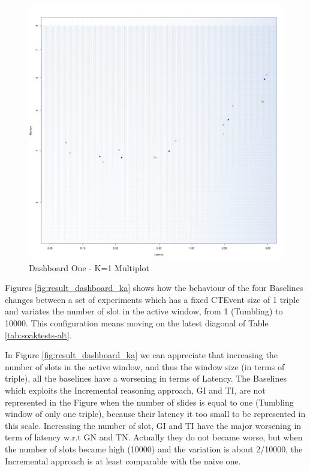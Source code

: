 \begin{figure}[htb]
	\centering
	\includegraphics[width=0.90\linewidth]{images/dashboard-1}	
	\caption{Dashboard One - K=1 Multiplot} 
	\label{fig:result_dashboard_kb}
\end{figure}

Figures \ref{fig:result_dashboard_ka} shows how the behaviour of the four Baselines changes between a set of experiments which has a fixed CTEvent size of 1 triple and variates the number of slot in the active window, from 1 (Tumbling) to 10000. This configuration means moving on the latest diagonal of Table \ref{tab:soaktests-alt}.

In Figure \ref{fig:result_dashboard_ka} we can appreciate that increasing the number of slots in the active window, and thus the window size (in terms of triple), all the baselines have a worsening in terms of Latency. The Baselines which exploits the Incremental reasoning approach, GI and TI, are not represented in the Figure when the number of slides is equal to one (Tumbling window of only one triple), because their latency it too small to be represented in this scale. Increasing the number of slot, GI and TI have the major worsening in term of latency w.r.t GN and TN. Actually they do not became worse, but when the number of slots became high (10000) and the variation is about 2/10000, the Incremental approach is at least comparable with the naive one.

